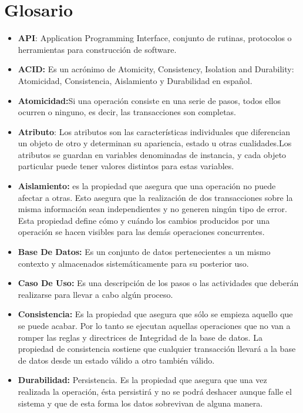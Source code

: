 \newpage
\section*{Glosario}
\begin{itemize}
  \item \textbf{API}: Application Programming Interface, conjunto de rutinas, protocolos o herramientas para construcción de software.
  \item \textbf{ACID:} Es un acrónimo de Atomicity, Consistency, Isolation and Durability: Atomicidad, Consistencia, Aislamiento y Durabilidad en español.
  \item \textbf{Atomicidad:}Si una operación consiste en una serie de pasos, todos ellos ocurren o ninguno, es decir, las transacciones son completas.
  
  \item \textbf{Atributo}: Los atributos son las características individuales que diferencian un objeto de otro y determinan su apariencia, estado u otras cualidades.Los atributos se guardan en variables denominadas de instancia, y cada objeto particular puede tener valores distintos para estas variables.
  \item \textbf{Aislamiento:} es la propiedad que asegura que una operación no puede afectar a otras. Esto asegura que la realización de dos transacciones sobre la misma información sean independientes y no generen ningún tipo de error.  Esta propiedad define cómo y cuándo los cambios producidos por una operación se hacen visibles para las demás operaciones concurrentes.
  \item \textbf{Base De Datos:} Es un conjunto de datos pertenecientes a un mismo contexto y almacenados sistemáticamente para su posterior uso.
  \item  \textbf{Caso De Uso:} Es una descripción de los pasos o las actividades que deberán realizarse para llevar a cabo algún proceso. 
  \item \textbf{Consistencia:} Es la propiedad que asegura que sólo se empieza aquello que se puede acabar. Por lo tanto se ejecutan aquellas operaciones que no van a romper las reglas y directrices de Integridad de la base de datos. La propiedad de consistencia sostiene que cualquier transacción llevará a la base de datos desde un estado válido a otro también válido. 
  \item \textbf{Durabilidad:} Persistencia. Es la propiedad que asegura que una vez realizada la operación, ésta persistirá y no se podrá deshacer aunque falle el sistema y que de esta forma los datos sobrevivan de alguna manera.

\end{itemize}
